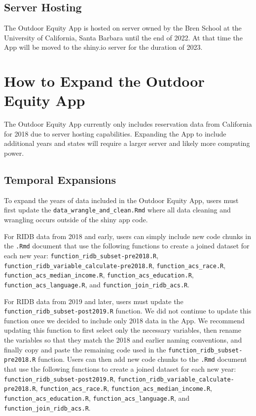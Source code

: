 \documentclass[
  11 pt,
  openany]{book}
\begin{document}
\hypertarget{server-hosting}{%
\subsection{Server Hosting}\label{server-hosting}}

The Outdoor Equity App is hosted on server owned by the Bren School at the University of California, Santa Barbara until the end of 2022. At that time the App will be moved to the shiny.io server for the duration of 2023.

\hypertarget{how-to-expand-the-outdoor-equity-app}{%
\section{How to Expand the Outdoor Equity App}\label{how-to-expand-the-outdoor-equity-app}}

The Outdoor Equity App currently only includes reservation data from California for 2018 due to server hosting capabilities. Expanding the App to include additional years and states will require a larger server and likely more computing power.

\hypertarget{temporal-expansions}{%
\subsection{Temporal Expansions}\label{temporal-expansions}}

To expand the years of data included in the Outdoor Equity App, users must first update the \texttt{data\_wrangle\_and\_clean.Rmd} where all data cleaning and wrangling occurs outside of the shiny app code.

For RIDB data from 2018 and early, users can simply include new code chunks in the \texttt{.Rmd} document that use the following functions to create a joined dataset for each new year: \texttt{function\_ridb\_subset-pre2018.R}, \texttt{function\_ridb\_variable\_calculate-pre2018.R}, \texttt{function\_acs\_race.R}, \texttt{function\_acs\_median\_income.R}, \texttt{function\_acs\_education.R}, \texttt{function\_acs\_language.R}, and \texttt{function\_join\_ridb\_acs.R}.

For RIDB data from 2019 and later, users must update the \texttt{function\_ridb\_subset-post2019.R} function. We did not continue to update this function once we decided to include only 2018 data in the App. We recommend updating this function to first select only the necessary variables, then rename the variables so that they match the 2018 and earlier naming conventions, and finally copy and paste the remaining code used in the \texttt{function\_ridb\_subset-pre2018.R} function. Users can then add new code chunks to the \texttt{.Rmd} document that use the following functions to create a joined dataset for each new year: \texttt{function\_ridb\_subset-post2019.R}, \texttt{function\_ridb\_variable\_calculate-pre2018.R}, \texttt{function\_acs\_race.R}, \texttt{function\_acs\_median\_income.R}, \texttt{function\_acs\_education.R}, \texttt{function\_acs\_language.R}, and \texttt{function\_join\_ridb\_acs.R}.
\end{document}
